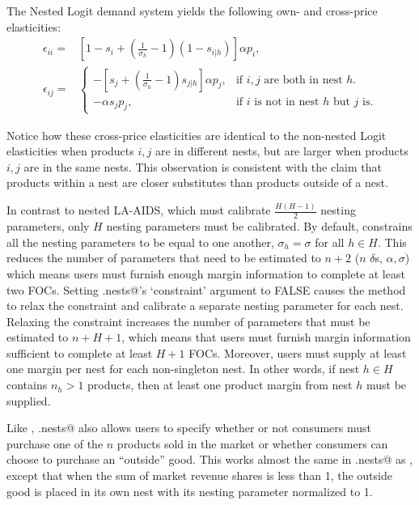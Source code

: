 \documentclass[11pt,numbers=noenddot,pointlessnumbers]{scrreprt}
\numberwithin{equation}{section}
\begin{document}
The Nested Logit demand system yields the following own- and cross-price elasticities:
\begin{align*}
  \epsilon_{ii}=&
    [1-s_i + (\frac{1}{\sigma_h}-1)(1-s_{i|h})]\alpha p_i, \\
  \epsilon_{ij}=&\begin{cases}
    -[s_j + (\frac{1}{\sigma_h}-1)s_{j|h}]\alpha p_j, &
    \text{if $i,j$ are both in nest $h$}.\\
    -\alpha s_jp_j, & \text{if $i$ is not in nest $h$ but $j$ is}.
  \end{cases}
\end{align*}


Notice how these cross-price elasticities are identical to the
non-nested Logit elasticities when products $i,j$ are in different
nests, but are larger when products $i,j$ are in the same nests. This
observation is consistent with the claim that products within a nest are
closer substitutes than products outside of a nest.

In contrast to nested LA-AIDS, which must
calibrate $\frac{H(H-1)}{2}$ nesting parameters, only $H$ nesting
parameters must be calibrated. By default,
\verb@calcSlopes@ constrains all the nesting parameters to be equal
to one another, $\sigma_h=\sigma$ for all $h\in H$. This reduces the
number of parameters that need to be estimated to $n+2$ ($n$
$\delta$s, $\alpha,\sigma$) which means users must furnish enough
margin information to complete at least two FOCs. Setting
\verb@logit.nests@'s `constraint' argument to
FALSE causes the \verb@calcSlopes@ method to relax the constraint and calibrate a separate
nesting parameter for each nest. Relaxing the constraint increases the
number of parameters that must be estimated to $n+H+1$, which means
that users must furnish margin information sufficient to
complete at least $H+1$ FOCs. Moreover, users must supply at least
one margin per nest for each non-singleton nest. In other words, if
nest $h\in H$ contains $n_h>1$ products,
then at least one product margin from nest $h$ must be supplied.

Like \verb@logit@,  \verb@logit.nests@ also allows
users to specify whether or not consumers must purchase one of the $n$
products sold in the market or whether consumers can choose to
purchase an ``outside'' good. This works almost the same in
\verb@logit.nests@ as \verb@logit@, except that when the sum of market
revenue shares is less than 1, the outside good is placed in its own nest with its nesting
parameter normalized to 1.
\end{document}
